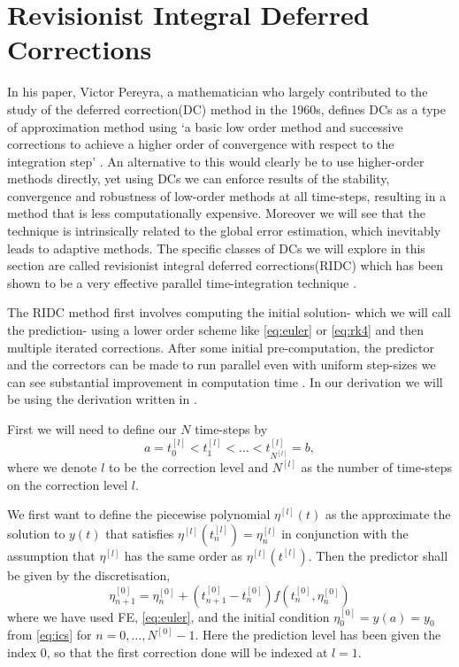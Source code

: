 \documentclass{report}
\begin{document}
\section{Revisionist Integral Deferred Corrections}
In his paper, Victor Pereyra, a mathematician who largely contributed to the study of the deferred correction(DC) method in the 1960s, defines DCs as a type of approximation method using `a basic low order method and successive corrections to achieve a higher order of convergence with respect to the integration step' \cite{pereyra1}. An alternative to this would clearly be to use higher-order methods directly, yet using DCs we can enforce results of the stability, convergence and robustness of low-order methods at all time-steps, resulting in a method that is less computationally expensive. Moreover we will see that the technique is intrinsically related to the global error estimation, which inevitably leads to adaptive methods. The specific classes of DCs we will explore in this section are called revisionist integral deferred corrections(RIDC) which has been shown to be a very effective parallel time-integration technique \cite{parra, ongchrist}. 

The RIDC method first involves computing the initial solution- which we will call the prediction- using a lower order scheme like \eqref{eq:euler} or \eqref{eq:rk4} and then multiple iterated corrections. After some initial pre-computation, the predictor and the correctors can be made to run parallel even with uniform step-sizes we can see substantial improvement in computation time \cite{parra}. In our derivation we will be using the derivation written in \cite{ridcbook}.

First we will need to define our $N$ time-steps by
\begin{equation*}
    a = t_0^{[l]} < t_1^{[l]} < \dots < t_{N^{[l]}}^{[l]} =b,
\end{equation*}
where we denote $l$ to be the correction level and $N^{[l]}$ as the number of time-steps on the correction level $l$. 

We first want to define the piecewise polynomial $\eta^{[l]}(t)$  as the approximate the solution to $y(t)$ that satisfies $\eta^{[l]}(t^{[l]}_n)= \eta^{[l]}_n$ in conjunction with the assumption that $\eta^{[l]}$ has the same order as $\eta^{[l]}(t^{[l]})$. Then the predictor shall be given by the discretisation, 
\begin{equation*}
    \eta^{[0]}_{n+1} = \eta^{[0]}_n + (t^{[0]}_{n+1}- t^{[0]}_n) f(t^{[0]}_n, \eta^{[0]}_n)
    \label{eq:ridc_p_fe}
\end{equation*}
where we have used FE, \eqref{eq:euler}, and the initial condition $\eta^{[0]}_0=y(a)=y_0$ from \eqref{eq:ics} for $n=0,\dots, N^{[0]}-1$. Here the prediction level has been given the index 0, so that the first correction done will be indexed at $l=1$. 
\end{document}

